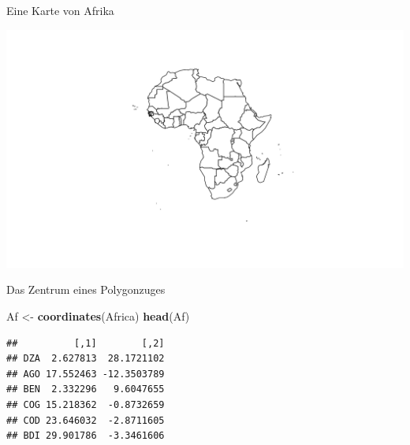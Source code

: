 \documentclass[ignorenonframetext,]{beamer}
\newenvironment{Shaded}{\begin{snugshade}}{\end{snugshade}}
\newcommand{\DecValTok}[1]{\textcolor[rgb]{0.27,0.67,0.26}{#1}}
\newcommand{\KeywordTok}[1]{\textcolor[rgb]{0.26,0.66,0.93}{\textbf{#1}}}
\newcommand{\NormalTok}[1]{\textcolor[rgb]{0.74,0.68,0.62}{#1}}
\newcommand{\OperatorTok}[1]{\textcolor[rgb]{0.74,0.68,0.62}{#1}}
\newcommand{\StringTok}[1]{\textcolor[rgb]{0.02,0.61,0.04}{#1}}
\begin{document}
\begin{frame}[fragile]{Eine Karte von Afrika}
\protect\hypertarget{eine-karte-von-afrika}{}

\begin{Shaded}
\end{Shaded}

\includegraphics{A7_spdep_files/figure-beamer/unnamed-chunk-11-1.pdf}

\end{frame}

\begin{frame}[fragile]{Das Zentrum eines Polygonzuges}
\protect\hypertarget{das-zentrum-eines-polygonzuges}{}

\begin{Shaded}
\begin{Highlighting}[]
\NormalTok{Af <-}\StringTok{ }\KeywordTok{coordinates}\NormalTok{(Africa)}
\KeywordTok{head}\NormalTok{(Af)}
\end{Highlighting}
\end{Shaded}

\begin{verbatim}
##          [,1]        [,2]
## DZA  2.627813  28.1721102
## AGO 17.552463 -12.3503789
## BEN  2.332296   9.6047655
## COG 15.218362  -0.8732659
## COD 23.646032  -2.8711605
## BDI 29.901786  -3.3461606
\end{verbatim}

\end{frame}
\end{document}
